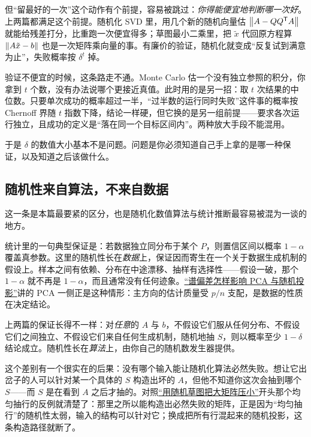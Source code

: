 但``留最好的一次''这个动作有个前提，容易被跳过：\emph{你得能便宜地判断哪一次好}。上两篇都满足这个前提。随机化 SVD 里，用几个新的随机向量估 \(\left\lVert A-QQ^{\mathsf{T}}A\right\rVert\) 就能给残差打分，比重跑一次便宜得多；草图最小二乘里，把 \(\tilde x\) 代回原方程算 \(\left\lVert A\tilde x-b\right\rVert\) 也是一次矩阵乘向量的事。有廉价的验证，随机化就变成``反复试到满意为止''，失败概率按 \(\delta^t\) 掉。

验证不便宜的时候，这条路走不通。Monte Carlo 估一个没有独立参照的积分，你拿到 \(t\) 个数，没有办法说哪个更接近真值。此时用的是另一招：取 \(t\) 次结果的中位数。只要单次成功的概率超过一半，``过半数的运行同时失败''这件事的概率按 Chernoff 界随 \(t\) 指数下降，结论一样硬，但它换的是另一组前提——要求各次运行独立，且成功的定义是``落在同一个目标区间内''。两种放大手段不能混用。

于是 \(\delta\) 的数值大小基本不是问题。问题是你必须知道自己手上拿的是哪一种保证，以及知道之后该做什么。

\subsection{随机性来自算法，不来自数据}

这一条是本篇最要紧的区分，也是随机化数值算法与统计推断最容易被混为一谈的地方。

统计里的一句典型保证是：若数据独立同分布于某个 \(P\)，则置信区间以概率 \(1-\alpha\) 覆盖真参数。这里的随机性长在\emph{数据}上，保证因而寄生在一个关于数据生成机制的假设上。样本之间有依赖、分布在中途漂移、抽样有选择性——假设一破，那个 \(1-\alpha\) 就不再是 \(1-\alpha\)，而且通常没有任何迹象。\hyperref[sec:11-Mathematical-Statistics/09-Random-Matrix-Theory/03]{``谱偏差怎样影响 PCA 与随机投影''}讲的 PCA 一侧正是这种情形：主方向的估计质量受 \(p/n\) 支配，是数据的性质在决定结论。

上两篇的保证长得不一样：对\emph{任意}的 \(A\) 与 \(b\)，不假设它们服从任何分布、不假设它们之间独立、不假设它们来自任何生成机制，随机地抽 \(S\)，则以概率至少 \(1-\delta\) 结论成立。随机性长在\emph{算法}上，由你自己的随机数发生器提供。

这个差别有一个很实在的后果：没有哪个输入能让随机化算法必然失败。想让它出岔子的人可以针对某一个具体的 \(S\) 构造出坏的 \(A\)，但他不知道你这次会抽到哪个 \(S\)——而 \(S\) 是在看到 \(A\) 之后才抽的。对照\hyperref[sec:08-Numerical-Analysis/05-Numerical-Linear-Algebra/08]{``用随机草图把大矩阵压小''}开头那个均匀抽行的反例就清楚了：那里之所以能构造出必然失败的矩阵，正是因为``均匀抽行''的随机性太弱，输入的结构可以针对它；换成把所有行混起来的随机投影，这条构造路径就断了。

